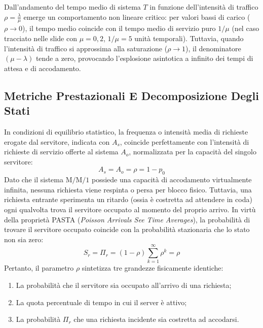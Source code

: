 \documentclass[11pt, a4paper]{article}
\begin{document}

Dall'andamento del tempo medio di sistema $T$ in funzione dell'intensità di traffico $\rho = \frac{\lambda}{\mu}$ emerge un comportamento non lineare critico: per valori bassi di carico ($\rho \to 0$), il tempo medio coincide con il tempo medio di servizio puro $1/\mu$ (nel caso tracciato nelle slide con $\mu = 0{,}2$, $1/\mu = 5$ unità temporali). Tuttavia, quando l'intensità di traffico si approssima alla saturazione ($\rho \to 1$), il denominatore $(\mu - \lambda)$ tende a zero, provocando l'esplosione asintotica a infinito dei tempi di attesa e di accodamento.

\subsection{Metriche Prestazionali E Decomposizione Degli Stati}

In condizioni di equilibrio statistico, la frequenza o intensità media di richieste erogate dal servitore, indicata con $A_s$, coincide perfettamente con l'intensità di richieste di servizio offerte al sistema $A_o$, normalizzata per la capacità del singolo servitore:
\[
A_s = A_o = \rho = 1 - p_0
\]
Dato che il sistema $\mathrm{M/M/1}$ possiede una capacità di accodamento virtualmente infinita, nessuna richiesta viene respinta o persa per blocco fisico. Tuttavia, una richiesta entrante sperimenta un ritardo (ossia è costretta ad attendere in coda) ogni qualvolta trova il servitore occupato al momento del proprio arrivo. In virtù della proprietà PASTA (\emph{Poisson Arrivals See Time Averages}), la probabilità di trovare il servitore occupato coincide con la probabilità stazionaria che lo stato non sia zero:
\[
S_r = \Pi_r = (1 - \rho)\sum_{k=1}^{\infty} \rho^k = \rho
\]
Pertanto, il parametro $\rho$ sintetizza tre grandezze fisicamente identiche:
\begin{enumerate}[noitemsep]
    \item La probabilità che il servitore sia occupato all'arrivo di una richiesta;
    \item La quota percentuale di tempo in cui il server è attivo;
    \item La probabilità $\Pi_r$ che una richiesta incidente sia costretta ad accodarsi.
\end{enumerate}
\end{document}
